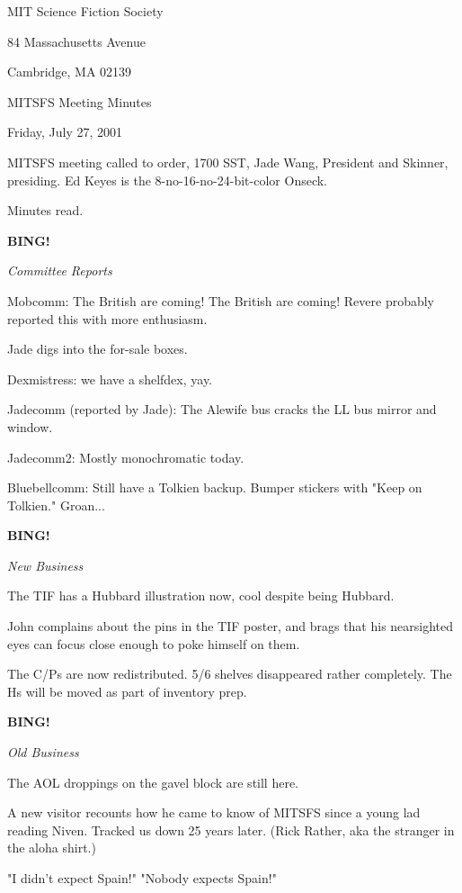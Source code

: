 \documentclass[12pt]{article}
\newcommand{\bing}{{\bf BING!} }
\newcommand{\goto}[1]{\bing \vskip 12pt \centerline{{\em{#1}}}}
\begin{document}
\begin{center}

MIT Science Fiction Society 

84 Massachusetts Avenue

Cambridge, MA 02139

\vspace{12pt}

MITSFS Meeting Minutes 

Friday, July 27, 2001

\end{center}
 
\vspace{18pt}

\setlength{\parskip}{6pt}

\noindent
MITSFS meeting called to order, 1700 SST, Jade Wang, President and
Skinner, presiding.  Ed Keyes is the 8-no-16-no-24-bit-color Onseck.

Minutes read.

\goto{Committee Reports}

Mobcomm: The British are coming! The British are coming! Revere probably reported this with more enthusiasm.

Jade digs into the for-sale boxes.

Dexmistress: we have a shelfdex, yay.

Jadecomm (reported by Jade): The Alewife bus cracks the LL bus mirror and window.

Jadecomm2: Mostly monochromatic today.

Bluebellcomm: Still have a Tolkien backup. Bumper stickers with "Keep on Tolkien." Groan...

\goto{New Business}

The TIF has a Hubbard illustration now, cool despite being Hubbard.

John complains about the pins in the TIF poster, and brags that his nearsighted eyes can focus close enough to poke himself on them.

The C/Ps are now redistributed. 5/6 shelves disappeared rather completely. The Hs will be moved as part of inventory prep.

\goto{Old Business}

The AOL droppings on the gavel block are still here. 

A new visitor recounts how he came to know of MITSFS since a young lad reading Niven. Tracked us down 25 years later. (Rick Rather, aka the stranger in the aloha shirt.)

"I didn't expect Spain!" "Nobody expects Spain!"
\end{document}
